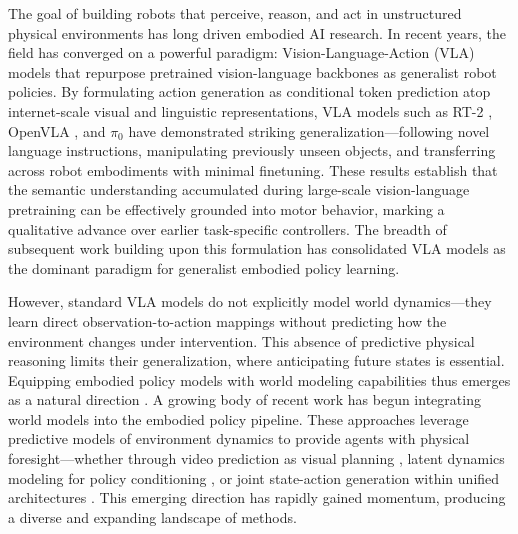 \label{sec:intro}

The goal of building robots that perceive, reason, and act in unstructured physical environments has long driven embodied AI research. In recent years, the field has converged on a powerful paradigm: Vision-Language-Action (VLA) models that repurpose pretrained vision-language backbones as generalist robot policies. By formulating action generation as conditional token prediction atop internet-scale visual and linguistic representations, VLA models such as RT-2 \cite{RT-2}, OpenVLA \cite{OpenVLA}, and $\pi_0$ \cite{pi0} have demonstrated striking generalization—following novel language instructions, manipulating previously unseen objects, and transferring across robot embodiments with minimal finetuning. These results establish that the semantic understanding accumulated during large-scale vision-language pretraining can be effectively grounded into motor behavior, marking a qualitative advance over earlier task-specific controllers. The breadth of subsequent work building upon this formulation has consolidated VLA models as the dominant paradigm for generalist embodied policy learning.

However, standard VLA models do not explicitly model world dynamics—they learn direct observation-to-action mappings without predicting how the environment changes under intervention\cite{fei2025liberoplus}. This absence of predictive physical reasoning limits their generalization, where anticipating future states is essential.
Equipping embodied policy models with world modeling capabilities thus emerges as a natural direction \cite{D2PO}.
A growing body of recent work has begun integrating world models into the embodied policy pipeline. These approaches leverage predictive models of environment dynamics to provide agents with physical foresight—whether through video prediction as visual planning \cite{unipi,du2023vlp,ko2024avdc,yang2025roboenvision,gu2026saydreamact}, latent dynamics modeling for policy conditioning \cite{hu2024vpp,pai2025mimicvideo,liang2025videopolicy,yan2026svam,LAPA}, or joint state-action generation within unified architectures \cite{CosmosPolicy,DreamZero,LingBotVA,Motus,UWM,PAD,PhysGen}. This emerging direction has rapidly gained momentum, producing a diverse and expanding landscape of methods.


